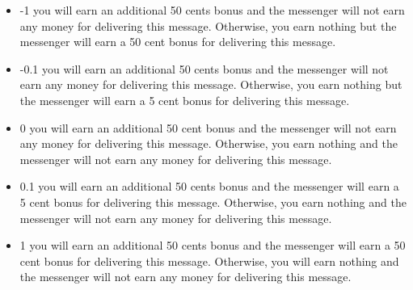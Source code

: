 \begin{itemize}
\item -1 you will earn an additional 50 cents bonus and the messenger will not
earn any money for delivering this message. Otherwise, you earn nothing but the
messenger will earn a 50 cent bonus for delivering this message.

\item -0.1 you will earn an additional 50 cents bonus and the messenger will
not earn any money for delivering this message. Otherwise, you earn nothing but
the messenger will earn a 5 cent bonus for delivering this message.

\item 0 you will earn an additional 50 cent bonus and the messenger will not
earn any money for delivering this message. Otherwise, you earn nothing and the
messenger will not earn any money for delivering this message.

\item 0.1 you will earn an additional 50 cents bonus and the messenger will
earn a 5 cent bonus for delivering this message. Otherwise, you earn nothing and
the messenger will not earn any money for delivering this message.

\item 1 you will earn an additional 50 cents bonus and the messenger will earn
a 50 cent bonus for delivering this message. Otherwise, you will earn nothing
and the messenger will not earn any money for delivering this message.
\end{itemize}

